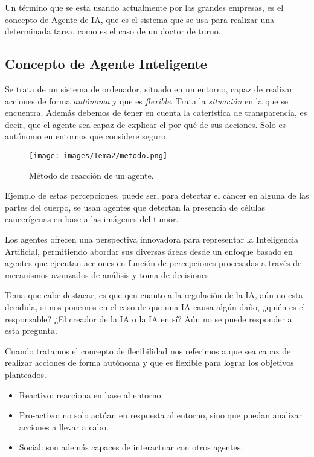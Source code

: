 Un término que se esta usando actualmente por las grandes empresas, es el concepto de Agente de IA, que es el sistema que se usa para realizar una determinada tarea, como es el caso de un doctor de turno.

\subsection{Concepto de Agente Inteligente}

Se trata de un sistema de ordenador, situado en un entorno, capaz de realizar acciones de forma \textit{autónoma} y que es \textit{flexible}. Trata la \textit{situación} en la que se encuentra.
Además debemos de tener en cuenta la caterística de transparencia, es decir, que el agente sea capaz de explicar el por qué de sus acciones. Solo es autónomo en entornos que considere seguro.

\begin{figure}[H]
    \centering
    \texttt{[image: images/Tema2/metodo.png]}
    \caption{Método de reacción de un agente.}
    \label{fig:agentes}
\end{figure}

Ejemplo de estas percepciones, puede ser, para detectar el cáncer en alguna de las partes del cuerpo, se usan agentes que detectan la presencia de células cancerígenas en base a las imágenes del tumor.

Los agentes ofrecen una perspectiva innovadora
para representar la Inteligencia Artificial,
permitiendo abordar sus diversas áreas desde
un enfoque basado en agentes que ejecutan
acciones en función de percepciones procesadas
a través de mecanismos avanzados de análisis y
toma de decisiones.

Tema que cabe destacar, es que qen cuanto a la regulación de la IA, aún no esta decidida, si nos ponemos en el caso de que una IA causa algún daño, ¿quién es el responsable? ¿El creador de la IA o la IA en sí? Aún no se puede responder a esta pregunta.

Cuando tratamos el concepto de flecibilidad nos referimos a que sea capaz de realizar acciones de forma autónoma y que es
flexible para lograr los objetivos planteados.
\begin{itemize}
    \item Reactivo: reacciona en base al entorno.
    \item Pro-activo: no solo actúan en respuesta al entorno, sino que puedan analizar acciones a llevar a cabo.
    \item Social: son además capaces de interactuar con otros agentes.
\end{itemize}

